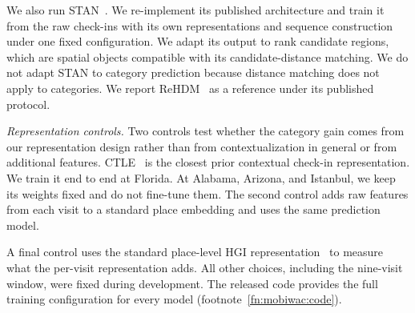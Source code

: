 We also run STAN~\cite{luo2021stan}. We re-implement its published architecture and train it from the raw check-ins with its own representations and sequence construction under one fixed configuration. We adapt its output to rank candidate regions, which are spatial objects compatible with its candidate-distance matching. We do not adapt STAN to category prediction because distance matching does not apply to categories. We report ReHDM~\cite{li2025rehdm} as a reference under its published protocol.

\emph{Representation controls.} Two controls test whether the category gain comes from our representation design rather than from contextualization in general or from additional features. CTLE~\cite{lin2021ctle} is the closest prior contextual check-in representation. We train it end to end at Florida. At Alabama, Arizona, and Istanbul, we keep its weights fixed and do not fine-tune them. The second control adds raw features from each visit to a standard place embedding and uses the same prediction model.

A final control uses the standard place-level HGI representation~\cite{huang2023hgi} to measure what the per-visit representation adds. All other choices, including the nine-visit window, were fixed during development. The released code provides the full training configuration for every model (footnote~\ref{fn:mobiwac:code}).
